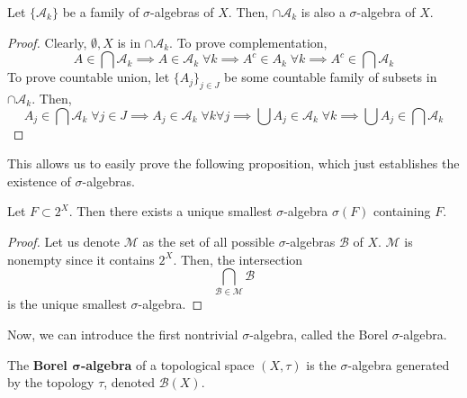   \begin{theorem}
    Let $\{\mathcal{A}_k\}$ be a family of $\sigma$-algebras of $X$. Then, $\cap \mathcal{A}_k$ is also a $\sigma$-algebra of $X$. 
  \end{theorem}
  \begin{proof}
    Clearly, $\emptyset, X$ is in $\cap \mathcal{A}_k$. To prove complementation, 
    \begin{equation}
      A \in \bigcap \mathcal{A}_k \implies A \in \mathcal{A}_k \; \forall k \implies A^c \in A_k \; \forall k \implies A^c \in \bigcap \mathcal{A}_k
    \end{equation}
    To prove countable union, let $\{A_j\}_{j \in J}$ be some countable family of subsets in $\cap \mathcal{A}_k$. Then, 
    \begin{equation}
      A_j \in \bigcap \mathcal{A}_k \; \forall j \in J \implies A_j \in \mathcal{A}_k \; \forall k \forall j \implies \bigcup A_j \in \mathcal{A}_k \; \forall k \implies \bigcup A_j \in \bigcap \mathcal{A}_k
    \end{equation}
  \end{proof}

  This allows us to easily prove the following proposition, which just establishes the existence of $\sigma$-algebras. 

  \begin{proposition}
    Let $F \subset 2^X$. Then there exists a unique smallest $\sigma$-algebra $\sigma(F)$ containing $F$. 
  \end{proposition}
  \begin{proof}
    Let us denote $\mathcal{M}$ as the set of all possible $\sigma$-algebras $\mathcal{B}$ of $X$. $\mathcal{M}$ is nonempty since it contains $2^X$. Then, the intersection 
    \begin{equation}
      \bigcap_{\mathcal{B} \in \mathcal{M}} \mathcal{B}
    \end{equation}
    is the unique smallest $\sigma$-algebra. 
  \end{proof}

  Now, we can introduce the first nontrivial $\sigma$-algebra, called the Borel $\sigma$-algebra. 

  \begin{definition}
    The \textbf{Borel $\boldsymbol{\sigma}$-algebra} of a topological space $(X, \tau)$ is the $\sigma$-algebra generated by the topology $\tau$, denoted $\mathcal{B}(X)$. 
  \end{definition}

